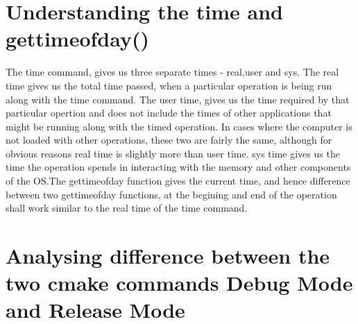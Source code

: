 \documentclass[11pt]{article}
\begin{document}
\section*{Understanding the time and gettimeofday() }
The time command, gives us three separate times - real,user and sys. The real time gives us the total time passed, when a particular operation is being run along with the time command. The user time, gives us the time required by that particular opertion and does not include the times of other applications that might be running along with the timed operation. In cases where the computer is not loaded with other operations, these two are fairly the same, although for obvious reasons real time is slightly more than user time. sys time gives us the time the operation spends in interacting with the memory and other components of the OS.\newline The gettimeofday function gives the current time, and hence difference between two gettimeofday functions, at the begining and end of the operation shall work similar to the real time of the time command.

\section*{Analysing difference between the two cmake commands Debug Mode and Release Mode}
\end{document}
